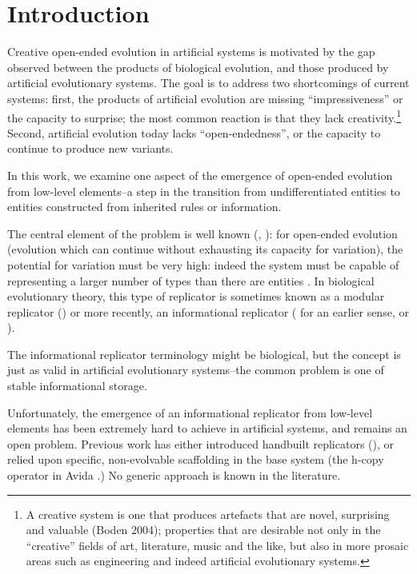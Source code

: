 \chapter{Introduction}

Creative open-ended evolution in artificial systems \parencite{Taylor2001} is motivated by the gap observed between the products of biological evolution, and those produced by artificial evolutionary systems. The goal is to address two shortcomings of current systems: first, the products of artificial evolution are missing “impressiveness” or the capacity to surprise; the most common reaction is that they lack creativity.\footnote{A creative system is one that produces artefacts that are novel, surprising and valuable (Boden 2004); properties that are desirable not only in the “creative” fields of art, literature, music and the like, but also in more prosaic areas such as engineering and indeed artificial evolutionary systems.} Second, artificial evolution today lacks “open-endedness”, or the capacity to continue to produce new variants. 

In this work, we examine one aspect of the emergence of open-ended evolution from low-level elements--a step in the transition from undifferentiated entities to entities constructed from inherited rules or information. 

The central element of the problem is well known (\eg, \textcite{Maynard-Smith:1995lw, Szathmary2000}): for open-ended evolution (evolution which can continue without exhausting its capacity for variation), the potential for variation must be very high: indeed the system must be capable of representing a larger number of types than there are entities \parencite{Szathmary1999}. In biological evolutionary theory, this type of replicator is sometimes known as a modular replicator (\eg \cite{Szathmary2000}) or more recently, an informational replicator (\textcite{Orgel1992} for an earlier sense, or \cite{Zachar2010}). 

The informational replicator terminology might be biological, but the concept is just as valid in artificial evolutionary systems--the common problem is one of stable informational storage. 

Unfortunately, the emergence of an informational replicator from low-level elements has been extremely hard to achieve in artificial systems, and remains an open problem. Previous work has either introduced handbuilt replicators (\eg \cite{Hutton2003}), or relied upon specific, non-evolvable scaffolding in the base system (\eg the h-copy operator in Avida \parencite{Ofria2004}.) No generic approach is known in the literature.

